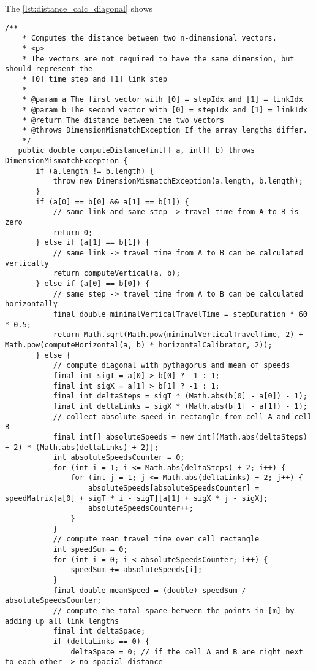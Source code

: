 The \cref{lst:distance_calc_diagonal} shows 
\begin{lstlisting}[basicstyle=\tiny, style=java, caption={Implementation of \textit{diagonal distance calculation}}, label=lst:distance_calc_diagonal] 
	/**
	* Computes the distance between two n-dimensional vectors.
	* <p>
	* The vectors are not required to have the same dimension, but should represent the
	* [0] time step and [1] link step
	*
	* @param a The first vector with [0] = stepIdx and [1] = linkIdx
	* @param b The second vector with [0] = stepIdx and [1] = linkIdx
	* @return The distance between the two vectors
	* @throws DimensionMismatchException If the array lengths differ.
	*/
   public double computeDistance(int[] a, int[] b) throws DimensionMismatchException {
	   if (a.length != b.length) {
		   throw new DimensionMismatchException(a.length, b.length);
	   }
	   if (a[0] == b[0] && a[1] == b[1]) {
		   // same link and same step -> travel time from A to B is zero
		   return 0;
	   } else if (a[1] == b[1]) {
		   // same link -> travel time from A to B can be calculated vertically
		   return computeVertical(a, b);
	   } else if (a[0] == b[0]) {
		   // same step -> travel time from A to B can be calculated horizontally
		   final double minimalVerticalTravelTime = stepDuration * 60 * 0.5;
		   return Math.sqrt(Math.pow(minimalVerticalTravelTime, 2) + Math.pow(computeHorizontal(a, b) * horizontalCalibrator, 2));
	   } else {
		   // compute diagonal with pythagorus and mean of speeds
		   final int sigT = a[0] > b[0] ? -1 : 1;
		   final int sigX = a[1] > b[1] ? -1 : 1;
		   final int deltaSteps = sigT * (Math.abs(b[0] - a[0]) - 1);
		   final int deltaLinks = sigX * (Math.abs(b[1] - a[1]) - 1);
		   // collect absolute speed in rectangle from cell A and cell B
		   final int[] absoluteSpeeds = new int[(Math.abs(deltaSteps) + 2) * (Math.abs(deltaLinks) + 2)];
		   int absoluteSpeedsCounter = 0;
		   for (int i = 1; i <= Math.abs(deltaSteps) + 2; i++) {
			   for (int j = 1; j <= Math.abs(deltaLinks) + 2; j++) {
				   absoluteSpeeds[absoluteSpeedsCounter] = speedMatrix[a[0] + sigT * i - sigT][a[1] + sigX * j - sigX];
				   absoluteSpeedsCounter++;
			   }
		   }
		   // compute mean travel time over cell rectangle
		   int speedSum = 0;
		   for (int i = 0; i < absoluteSpeedsCounter; i++) {
			   speedSum += absoluteSpeeds[i];
		   }
		   final double meanSpeed = (double) speedSum / absoluteSpeedsCounter;
		   // compute the total space between the points in [m] by adding up all link lengths
		   final int deltaSpace;
		   if (deltaLinks == 0) {
			   deltaSpace = 0; // if the cell A and B are right next to each other -> no spacial distance

\end{lstlisting}
